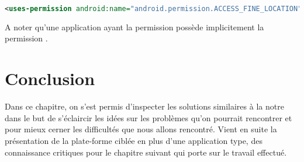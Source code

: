 \begin{lstlisting}[language=xml, caption=permission pour la localisation par GPS.]
<uses-permission android:name="android.permission.ACCESS_FINE_LOCATION"/>
\end{lstlisting}

A noter qu'une application ayant la permission  possède implicitement la permission .

\section{Conclusion}

Dans ce chapitre, on s'est permis d'inspecter les solutions similaires à
la notre dans le but de s'éclaircir les idées sur les problèmes qu'on
pourrait rencontrer et pour mieux cerner les difficultés que nous allons
rencontré. Vient en suite la présentation de la plate-forme ciblée en
plus d'une application type, des connaissance critiques pour le chapitre
suivant qui porte sur le travail effectué.
